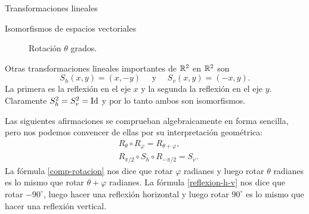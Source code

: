 \begin{chapter}{Transformaciones lineales}
\begin{section}{Isomorfismos de espacios vectoriales}
\begin{ejemplo}
                \begin{figure}[h]
                    \centering	
                \caption{Rotación  $\theta$ grados. }
                \label{rotacion-theta}
            \end{figure}
            
            
            
            Otras transformaciones lineales importantes de $\mathbb R^2$ en $\mathbb R^2$ son 
            $$
            S_h(x,y) = (x,-y) \quad \text{ y } \quad S_v(x,y) = (-x,y).
            $$
            La primera es la reflexión en el eje $x$ y la segunda la reflexión en el eje $y$. Claramente $S_h^2 = S_v^2 = \operatorname{Id}$ y por lo tanto ambos son isomorfismos. 
            
            Las siguientes afirmaciones se comprueban algebraicamente en forma sencilla, pero nos podemos convencer de ellas por su interpretación geométrica:
            \begin{align}
            &R_\theta \circ R_\varphi = R_{\theta +\varphi}, \label{comp-rotacion}\\
            &R_{\pi/2} \circ S_h \circ R_{-\pi/2} = S_v\label{reflexion-h-v}.
            \end{align}
            La fórmula \eqref{comp-rotacion} nos dice que rotar $\varphi$ radianes y luego rotar $\theta$ radianes es lo mismo que  rotar $\theta+\varphi$ radianes. La fórmula \eqref{reflexion-h-v} nos dice que rotar $-90^\circ$, luego  hacer una reflexión horizontal y luego rotar $90^\circ$ es lo mismo que hacer una reflexión vertical. 
        \end{ejemplo}


\end{section}
\end{chapter}

